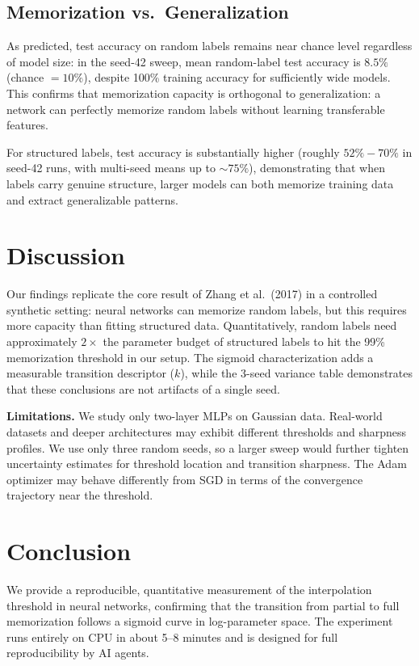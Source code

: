 \documentclass[11pt]{article}
\begin{document}
\subsection{Memorization vs.\ Generalization}

As predicted, test accuracy on random labels remains near chance level regardless of model size: in the seed-42 sweep, mean random-label test accuracy is $8.5\%$ (chance $=10\%$), despite 100\% training accuracy for sufficiently wide models. This confirms that memorization capacity is orthogonal to generalization: a network can perfectly memorize random labels without learning transferable features.

For structured labels, test accuracy is substantially higher (roughly $52\%-70\%$ in seed-42 runs, with multi-seed means up to $\sim 75\%$), demonstrating that when labels carry genuine structure, larger models can both memorize training data and extract generalizable patterns.

\section{Discussion}

Our findings replicate the core result of Zhang et al.\ (2017) in a controlled synthetic setting: neural networks can memorize random labels, but this requires more capacity than fitting structured data. Quantitatively, random labels need approximately $2\times$ the parameter budget of structured labels to hit the 99\% memorization threshold in our setup. The sigmoid characterization adds a measurable transition descriptor ($k$), while the 3-seed variance table demonstrates that these conclusions are not artifacts of a single seed.

\textbf{Limitations.} We study only two-layer MLPs on Gaussian data. Real-world datasets and deeper architectures may exhibit different thresholds and sharpness profiles. We use only three random seeds, so a larger sweep would further tighten uncertainty estimates for threshold location and transition sharpness. The Adam optimizer may behave differently from SGD in terms of the convergence trajectory near the threshold.

\section{Conclusion}

We provide a reproducible, quantitative measurement of the interpolation threshold in neural networks, confirming that the transition from partial to full memorization follows a sigmoid curve in log-parameter space. The experiment runs entirely on CPU in about 5--8 minutes and is designed for full reproducibility by AI agents.
\end{document}
